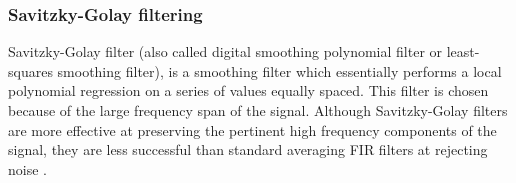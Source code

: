 \subsubsection{Savitzky-Golay filtering}

Savitzky-Golay filter (also called digital smoothing polynomial filter or least-squares smoothing filter), is a smoothing filter which essentially performs a local polynomial regression on a series of values equally spaced. This filter is chosen because of the large frequency span of the signal. Although Savitzky-Golay filters are more effective at preserving the pertinent high frequency components of the signal, they are less successful than standard averaging FIR filters at rejecting noise \cite{signal_processing}.
